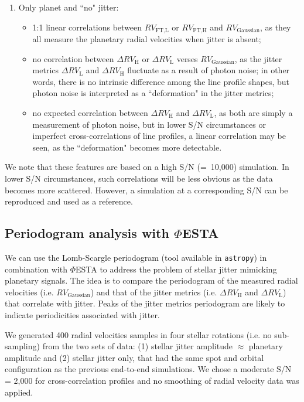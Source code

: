 \begin{enumerate}[label=(\alph*)]
	\item Only planet and ``no" jitter:
	\begin{itemize}
		\item 1:1 linear correlations between $RV_\text{FT,L}$ or $RV_\text{FT,H}$ and $RV_\text{Gaussian}$, as they all measure the planetary radial velocities when jitter is absent;
		\item no correlation between $\Delta RV_\text{H}$ or $\Delta RV_\text{L}$ verses $RV_\text{Gaussian}$, as the jitter metrics $\Delta RV_\text{L}$ and $\Delta RV_\text{H}$ fluctuate as a result of photon noise; in other words, there is no intrinsic difference among the line profile shapes, but photon noise is interpreted as a ``deformation" in the jitter metrics;
		\item no expected correlation between $\Delta RV_\text{H}$ and $\Delta RV_\text{L}$, as both are simply a measurement of photon noise, but in lower S/N circumstances or imperfect cross-correlations of line profiles, a linear correlation may be seen, as the ``deformation" becomes more detectable.  
	\end{itemize}	

\end{enumerate}

We note that these features are based on a high S/N (=~10,000) simulation. In lower S/N circumstances, such correlations will be less obvious as the data becomes more scattered. However, a simulation at a corresponding S/N can be reproduced and used as a reference. 


\subsection{Periodogram analysis with $\mathit{\Phi}$ESTA}

We can use the Lomb-Scargle periodogram (tool available in \verb|astropy|) in combination with $\mathit{\Phi}$ESTA to address the problem of stellar jitter mimicking planetary signals. The idea is to compare the periodogram of the measured radial velocities (i.e. $RV_\text{Gaussian}$) and that of the jitter metrics (i.e. $\Delta RV_\text{H}$ and $\Delta RV_\text{L}$) that correlate with jitter. Peaks of the jitter metrics periodogram are likely to indicate periodicities associated with jitter. 

We generated 400 radial velocities samples in four stellar rotations (i.e. no sub-sampling) from the two sets of data: (1) stellar jitter amplitude $\approx$ planetary amplitude and (2) stellar jitter only, that had the same spot and orbital configuration as the previous end-to-end simulations. We chose a moderate S/N = 2,000 for cross-correlation profiles and no smoothing of radial velocity data was applied. 

